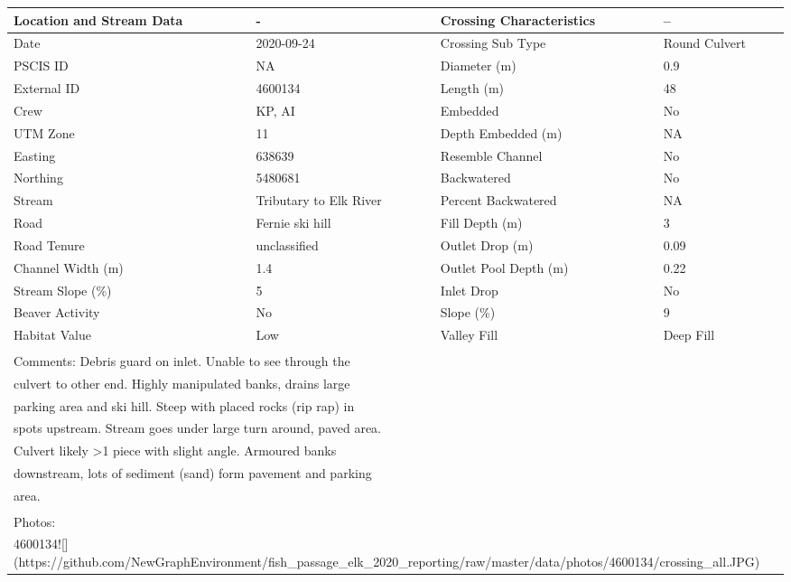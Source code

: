 \documentclass[
]{book}
\begin{document}
\begin{tabular}{l|l|l|l}
\hline
Location and Stream Data & - & Crossing Characteristics & --\\
\hline
Date & 2020-09-24 & Crossing Sub Type & Round Culvert\\
\hline
PSCIS ID & NA & Diameter (m) & 0.9\\
\hline
External ID & 4600134 & Length (m) & 48\\
\hline
Crew & KP, AI & Embedded & No\\
\hline
UTM Zone & 11 & Depth Embedded (m) & NA\\
\hline
Easting & 638639 & Resemble Channel & No\\
\hline
Northing & 5480681 & Backwatered & No\\
\hline
Stream & Tributary to Elk River & Percent Backwatered & NA\\
\hline
Road & Fernie ski hill & Fill Depth (m) & 3\\
\hline
Road Tenure & unclassified & Outlet Drop (m) & 0.09\\
\hline
Channel Width (m) & 1.4 & Outlet Pool Depth (m) & 0.22\\
\hline
Stream Slope (\%) & 5 & Inlet Drop & No\\
\hline
Beaver Activity & No & Slope (\%) & 9\\
\hline
Habitat Value & Low & Valley Fill & Deep Fill\\
\hline
\multicolumn{4}{l}{\textsuperscript{} Comments: Debris guard on inlet. Unable to see through the}\\
\multicolumn{4}{l}{culvert to other end. Highly manipulated banks, drains large}\\
\multicolumn{4}{l}{parking area and ski hill. Steep with placed rocks (rip rap) in}\\
\multicolumn{4}{l}{spots upstream. Stream goes under large turn around, paved area.}\\
\multicolumn{4}{l}{Culvert likely >1 piece with slight angle. Armoured banks}\\
\multicolumn{4}{l}{downstream, lots of sediment (sand) form pavement and parking}\\
\multicolumn{4}{l}{area.}\\
\multicolumn{4}{l}{\textsuperscript{} Photos:}\\
\multicolumn{4}{l}{4600134![](https://github.com/NewGraphEnvironment/fish\_passage\_elk\_2020\_reporting/raw/master/data/photos/4600134/crossing\_all.JPG)}\\
\end{tabular}
\end{document}
